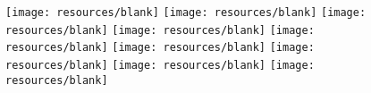 \documentclass[11pt]{article}
\newcommand{\backgroundimage}{celltypes_horizontal_add_arrows.pdf} %
\begin{document}


\begin{figure}[htbp]
  \centering
  \begin{minipage}[t]{0.125\textwidth} %
    \centering
    \vspace{-0.3871\linewidth} %
    \texttt{[image: resources/blank]}
    \texttt{[image: resources/blank]}
    \texttt{[image: resources/blank]} %
    \texttt{[image: resources/blank]}
    \texttt{[image: resources/blank]} %
    \texttt{[image: resources/blank]}
    \texttt{[image: resources/blank]}
    \texttt{[image: resources/blank]} %
    \texttt{[image: resources/blank]} %



\end{minipage}
\end{figure}
\end{document}
